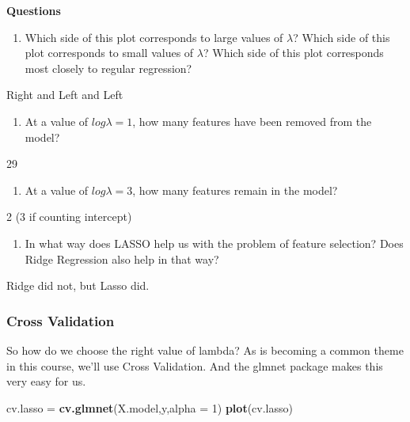 \documentclass[]{article}
\newenvironment{Shaded}{\begin{snugshade}}{\end{snugshade}}
\newcommand{\KeywordTok}[1]{\textcolor[rgb]{0.13,0.29,0.53}{\textbf{{#1}}}}
\newcommand{\DataTypeTok}[1]{\textcolor[rgb]{0.13,0.29,0.53}{{#1}}}
\newcommand{\DecValTok}[1]{\textcolor[rgb]{0.00,0.00,0.81}{{#1}}}
\newcommand{\StringTok}[1]{\textcolor[rgb]{0.31,0.60,0.02}{{#1}}}
\newcommand{\NormalTok}[1]{{#1}}
\providecommand{\tightlist}{%
  \setlength{\itemsep}{0pt}\setlength{\parskip}{0pt}}
\begin{document}
\textbf{Questions}

\begin{enumerate}
\def\labelenumi{\arabic{enumi}.}
\tightlist
\item
  Which side of this plot corresponds to large values of \(\lambda\)?
  Which side of this plot corresponds to small values of \(\lambda\)?
  Which side of this plot corresponds most closely to regular
  regression?
\end{enumerate}

Right and Left and Left

\begin{enumerate}
\def\labelenumi{\arabic{enumi}.}
\setcounter{enumi}{1}
\tightlist
\item
  At a value of \(log \lambda = 1\), how many features have been removed
  from the model?
\end{enumerate}

29

\begin{enumerate}
\def\labelenumi{\arabic{enumi}.}
\setcounter{enumi}{2}
\tightlist
\item
  At a value of \(log \lambda = 3\), how many features remain in the
  model?
\end{enumerate}

2 (3 if counting intercept)

\begin{enumerate}
\def\labelenumi{\arabic{enumi}.}
\setcounter{enumi}{3}
\tightlist
\item
  In what way does LASSO help us with the problem of feature selection?
  Does Ridge Regression also help in that way?
\end{enumerate}

Ridge did not, but Lasso did.

\subsubsection{Cross Validation}\label{cross-validation}

So how do we choose the right value of lambda? As is becoming a common
theme in this course, we'll use Cross Validation. And the glmnet package
makes this very easy for us.

\begin{Shaded}
\begin{Highlighting}[]
\NormalTok{cv.lasso =}\StringTok{ }\KeywordTok{cv.glmnet}\NormalTok{(X.model,y,}\DataTypeTok{alpha =} \DecValTok{1}\NormalTok{)}
\KeywordTok{plot}\NormalTok{(cv.lasso)}
\end{Highlighting}
\end{Shaded}
\end{document}
